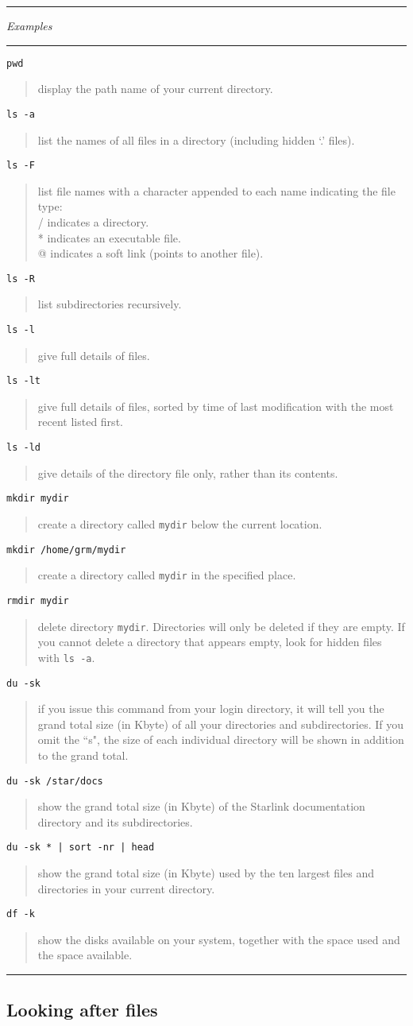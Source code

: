 \documentclass[twoside,11pt,nolof]{starlink}
\providecommand{\example}[2]{\goodbreak
                         \texttt{#1}
                         \vspace*{-4mm}
                         \begin{quote}
                           {\small #2}
                         \end{quote}
                        }
\providecommand{\exbegin}{\begin{center}
                      \rule{18mm}{0.3mm}
                      \emph{Examples}
                      \rule{18mm}{0.3mm}
                      \end{center}
                     }
\providecommand{\exend}{\begin{center}
                    \rule{50mm}{0.3mm}
                    \end{center}
                   }
\begin{document}
\goodbreak

\exbegin

\example{pwd}
{display the path name of your current directory.}

\example{ls -a}
{list the names of all files in a directory (including hidden `.' files).}

\example{ls -F}
{list file names with a character appended to each name indicating
  the file type: \\
  /  indicates a directory.\\
  {*} indicates an executable file.\\
  @ indicates a soft link (points to another file).}

\example{ls -R}
{list subdirectories recursively.}

\example{ls -l}
{give full details of files.}

\example{ls -lt}
{give full details of files, sorted by time of last modification with the most
recent listed first.}

\example{ls -ld}
{give details of the directory file only, rather than its contents.}

\example{mkdir mydir}
{create a directory called \texttt{mydir} below the current location.}

\example{mkdir /home/grm/mydir}
{create a directory called \texttt{mydir} in the specified place.}

\example{rmdir mydir}
{delete directory \texttt{mydir}. Directories will only be deleted if they are
empty.
If you cannot delete a directory that appears empty, look for hidden files
with \texttt{ls -a}.}

\example{du -sk}
{if you issue this command from your login directory, it will tell you the
grand total size (in Kbyte) of all your directories and subdirectories.
If you omit the ``s", the size of each individual directory will be shown
in addition to the grand total.}

\example{du -sk /star/docs}
{show the grand total size (in Kbyte) of the Starlink documentation directory
and its subdirectories.}

\example{du -sk * | sort -nr | head}
{show the grand total size (in Kbyte) used by the ten largest files
and directories in your current directory.}

\example{df -k}
{show the disks available on your system, together with the space used and the
space available.}

\exend

\subsection{Looking after files}
\end{document}
